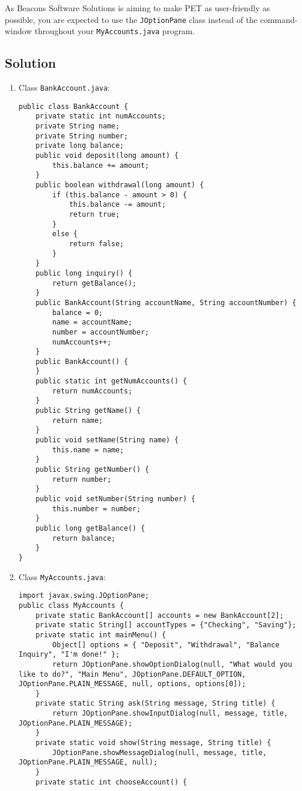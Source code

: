 \documentclass[12pt,letterpaper,twoside]{article}
\begin{document}
As Beacons Software Solutions is aiming to make PET as user-friendly as possible, you are expected to use the \texttt{JOptionPane} class instead of the command-window throughout your \texttt{MyAccounts.java} program.

\subsection*{Solution}

\begin{enumerate}
\item Class \texttt{BankAccount.java}:
\lstset{language=java}
\begin{lstlisting}
public class BankAccount {
	private static int numAccounts;
	private String name;
	private String number;
	private long balance;
	public void deposit(long amount) {
		this.balance += amount;
	}
	public boolean withdrawal(long amount) {
		if (this.balance - amount > 0) {
			this.balance -= amount;
			return true;
		}
		else {
			return false;
		}
	}
	public long inquiry() {
		return getBalance();
	}
	public BankAccount(String accountName, String accountNumber) {
		balance = 0;
		name = accountName;
		number = accountNumber;
		numAccounts++;
	}
	public BankAccount() {
	}
	public static int getNumAccounts() {
		return numAccounts;
	}
	public String getName() {
		return name;
	}
	public void setName(String name) {
		this.name = name;
	}
	public String getNumber() {
		return number;
	}
	public void setNumber(String number) {
		this.number = number;
	}
	public long getBalance() {
		return balance;
	}
}
\end{lstlisting}
\item Class \texttt{MyAccounts.java}:
\lstset{language=java}
\begin{lstlisting}
import javax.swing.JOptionPane;
public class MyAccounts {
	private static BankAccount[] accounts = new BankAccount[2];
	private static String[] accountTypes = {"Checking", "Saving"};
	private static int mainMenu() {
		Object[] options = { "Deposit", "Withdrawal", "Balance Inquiry", "I'm done!" };
		return JOptionPane.showOptionDialog(null, "What would you like to do?", "Main Menu", JOptionPane.DEFAULT_OPTION, JOptionPane.PLAIN_MESSAGE, null, options, options[0]);
	}
	private static String ask(String message, String title) {
		return JOptionPane.showInputDialog(null, message, title, JOptionPane.PLAIN_MESSAGE);
	}
	private static void show(String message, String title) {
		JOptionPane.showMessageDialog(null, message, title, JOptionPane.PLAIN_MESSAGE, null);
	}
	private static int chooseAccount() {

\end{lstlisting}
\end{enumerate}
\end{document}
